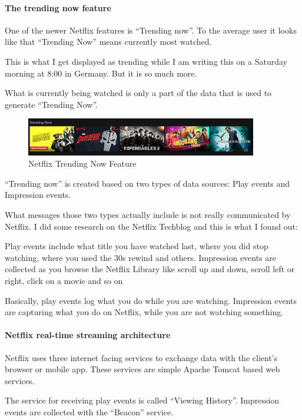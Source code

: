 \documentclass[12pt, numbers=noenddot]{scrreprt} %
\begin{document}
\paragraph{The trending now feature}
One of the newer Netflix features is “Trending now”. To the average user it looks like that “Trending Now” means currently most watched.

This is what I get displayed as trending while I am writing this on a Saturday morning at 8:00 in Germany. But it is so much more.

What is currently being watched is only a part of the data that is used to generate “Trending Now”.

\begin{figure}[htbp]
  \centering
     \includegraphics[width=0.9\textwidth]{images/Netflix-Trending-Now-Screenshot}
  \caption{Netflix Trending Now Feature}
  \label{fig:Bild1}
\end{figure}

“Trending now” is created based on two types of data sources: Play events and Impression events.

What messages those two types actually include is not really communicated by Netflix. I did some research on the Netflix Techblog and this is what I found out:

Play events include what title you have watched last, where you did stop watching, where you used the 30s rewind and others.
Impression events are collected as you browse the Netflix Library like scroll up and down, scroll left or right, click on a movie and so on

Basically, play events log what you do while you are watching. Impression events are capturing what you do on Netflix, while you are not watching something.

\paragraph{Netflix real-time streaming architecture}
Netflix uses three internet facing services to exchange data with the client’s browser or mobile app. These services are simple Apache Tomcat based web services.

The service for receiving play events is called “Viewing History”. Impression events are collected with the “Beacon” service.
\end{document}

